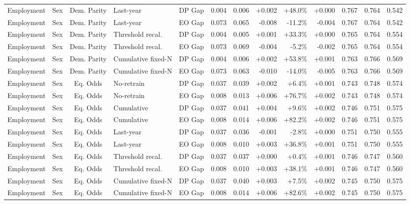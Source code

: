\begin{longtable}{llcllrrrrrrrr}
Employment & Sex & Dem. Parity & Last-year & DP Gap & 0.004 & 0.006 & +0.002 & +48.0\% & +0.000 & 0.767 & 0.764 & 0.542 \\
Employment & Sex & Dem. Parity & Last-year & EO Gap & 0.073 & 0.065 & -0.008 & -11.2\% & -0.004 & 0.767 & 0.764 & 0.542 \\
Employment & Sex & Dem. Parity & Threshold recal. & DP Gap & 0.004 & 0.005 & +0.001 & +33.3\% & +0.000 & 0.765 & 0.764 & 0.554 \\
Employment & Sex & Dem. Parity & Threshold recal. & EO Gap & 0.073 & 0.069 & -0.004 & -5.2\% & -0.002 & 0.765 & 0.764 & 0.554 \\
Employment & Sex & Dem. Parity & Cumulative fixed-N & DP Gap & 0.004 & 0.006 & +0.002 & +53.8\% & +0.001 & 0.763 & 0.766 & 0.569 \\
Employment & Sex & Dem. Parity & Cumulative fixed-N & EO Gap & 0.073 & 0.063 & -0.010 & -14.0\% & -0.005 & 0.763 & 0.766 & 0.569 \\
Employment & Sex & Eq. Odds & No-retrain & DP Gap & 0.037 & 0.039 & +0.002 & +6.4\% & +0.001 & 0.743 & 0.748 & 0.574 \\
Employment & Sex & Eq. Odds & No-retrain & EO Gap & 0.008 & 0.013 & +0.006 & +76.7\% & +0.002 & 0.743 & 0.748 & 0.574 \\
Employment & Sex & Eq. Odds & Cumulative & DP Gap & 0.037 & 0.041 & +0.004 & +9.6\% & +0.002 & 0.746 & 0.751 & 0.575 \\
Employment & Sex & Eq. Odds & Cumulative & EO Gap & 0.008 & 0.014 & +0.006 & +82.2\% & +0.002 & 0.746 & 0.751 & 0.575 \\
Employment & Sex & Eq. Odds & Last-year & DP Gap & 0.037 & 0.036 & -0.001 & -2.8\% & +0.000 & 0.751 & 0.750 & 0.555 \\
Employment & Sex & Eq. Odds & Last-year & EO Gap & 0.008 & 0.010 & +0.003 & +36.8\% & +0.001 & 0.751 & 0.750 & 0.555 \\
Employment & Sex & Eq. Odds & Threshold recal. & DP Gap & 0.037 & 0.037 & +0.000 & +0.4\% & +0.001 & 0.746 & 0.747 & 0.560 \\
Employment & Sex & Eq. Odds & Threshold recal. & EO Gap & 0.008 & 0.010 & +0.003 & +38.1\% & +0.001 & 0.746 & 0.747 & 0.560 \\
Employment & Sex & Eq. Odds & Cumulative fixed-N & DP Gap & 0.037 & 0.040 & +0.003 & +7.5\% & +0.002 & 0.745 & 0.750 & 0.575 \\
Employment & Sex & Eq. Odds & Cumulative fixed-N & EO Gap & 0.008 & 0.014 & +0.006 & +82.6\% & +0.002 & 0.745 & 0.750 & 0.575 \\

\end{longtable}
